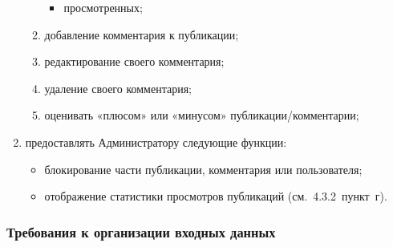 \documentclass{bmstu-gost-7-32}
\begin{document}
\begin{enumerate}
\begin{enumerate}
\begin{itemize}
			\item просмотренных;
		\end{itemize}
		\item добавление комментария к публикации;
		\item редактирование своего комментария;
		\item удаление своего комментария;
		\item оценивать «плюсом» или «минусом» публикации/комментарии;
	\end{enumerate}
	\item предоставлять Администратору следующие функции:
	\begin{itemize}
		\item блокирование части публикации, комментария или пользователя;
		\item отображение статистики просмотров публикаций (см.~4.3.2~пункт~г).
	\end{itemize}
\end{enumerate}

\subsubsection{Требования к организации входных данных}
\end{document}
